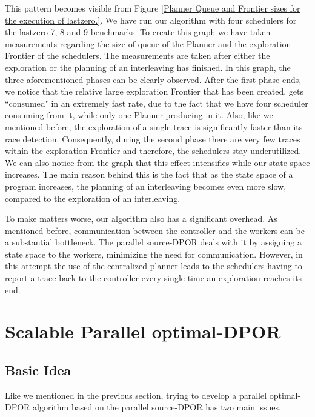 
This pattern becomes visible from Figure \ref{Planner Queue and Frontier sizes for the execution of lastzero.}.
We have run our algorithm with four schedulers for the lastzero 7, 8 and 9 benchmarks. 
To create this graph we have taken measurements regarding the size of queue of the Planner and the exploration Frontier of the schedulers. The measurements are taken after either the exploration or the planning of an interleaving has finished. In this graph, the three aforementioned phases can be clearly observed. After the first phase ends, we notice that the relative large exploration Frontier that has been created, gets ``consumed" in an extremely fast rate, due to the fact that we have four scheduler consuming from it, while only one Planner producing in it. Also, like we mentioned before, the exploration of a single trace is significantly faster than its race detection. Consequently, during the second phase there are very few traces within the exploration Frontier and therefore, the schedulers stay underutilized. We can also notice from the graph that this effect intensifies while our state space increases. The main reason behind this is the fact that as the state space of a program increases, the planning of an interleaving becomes even more slow, compared to the exploration of an interleaving. 

To make matters worse, our algorithm also has a significant overhead. As mentioned before, communication between
the controller and the workers can be a substantial bottleneck. The parallel source-DPOR deals with it by assigning
a state space to the workers, minimizing the need for communication. However, in this attempt the use of the centralized planner leads to the schedulers having to report a trace back to the controller every single
time an exploration reaches its end.

\section{Scalable Parallel optimal-DPOR}

\subsection{Basic Idea}

Like we mentioned in the previous section, trying to develop a parallel optimal-DPOR algorithm based on the parallel source-DPOR has two main issues.

